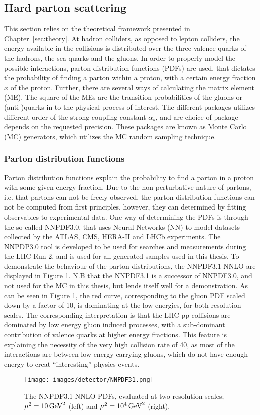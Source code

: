 \subsection*{Hard parton scattering}
\noindent
\justify
This section relies on the theoretical framework presented in Chapter~\ref{sec:theory}. 
At hadron colliders, as opposed to lepton colliders, the energy available in the collisions is distributed over the three valence quarks of the hadrons, the sea quarks and the gluons. 
In order to properly model the possible interactions, parton distribution functions (PDFs) are used, that dictates the probability of finding a parton within a proton, with a certain energy fraction $x$ of the proton. 
Further, there are several ways of calculating the matrix element (ME). The square of the MEs are the transition probabilities of the gluons or (anti-)quarks in to the physical process of interest.
The different packages utilizes different order of the strong coupling constant $\alpha_{s}$, and are choice of package depends on the requested precision.
These packages are known as Monte Carlo (MC) generators, which utilizes the MC random sampling technique.  
\subsubsection*{Parton distribution functions}
\noindent
\justify
Parton distribution functions explain the probability to find a parton in a proton with some given energy fraction. 
Due to the non-perturbative nature of partons, i.e. that partons can not be freely observed, the parton distribution functions can not be computed from first principles, however, they can determined by fitting observables to experimental data. 
One way of determining the PDFs is through the so-called NNPDF3.0, that uses Neural Networks (NN) to model datasets collected by the ATLAS, CMS, HERA-II and LHCb experiments\cite{Ball:2014uwa}. 
The NNPDP3.0 tool is developed to be used for searches and measurements during the LHC Run 2, and is used for all generated samples used in this thesis. 
To demonstrate the behaviour of the parton distributions, the NNPDF3.1 NNLO are displayed in Figure \ref{fig:NNPDF31}. 
N.B that the NNPDF3.1 is a successor of NNPDF3.0, and not used for the MC in this thesis, but lends itself well for a demonstration. 
As can be seen in Figure \ref{fig:NNPDF31}, the red curve, corresponding to the gluon PDF scaled down by a factor of 10, is dominating at the low energies, for both resolution scales. 
The corresponding interpretation is that the LHC pp collisions are dominated by low energy gluon induced processes, with a sub-dominant contribution of valence quarks at higher energy fractions. 
This feature is explaining the necessity of the very high collision rate of 40\MHz, as most of the interactions are between low-energy carrying gluons, which do not have enough energy to creat ``interesting'' physics events.  
\begin{figure}[!htp]
  \centering
   \texttt{[image: images/detector/NNPDF31.png]}
   \caption{The NNPDF3.1 NNLO PDFs, evaluated at two resolution scales; $\mu^{2}=10\,\text{Ge\hspace{-.08em}V}^{2}$ (left) and  $\mu^{2}=10^{4}\,\text{Ge\hspace{-.08em}V}^{2}$ (right)\cite{Ball:2017nwa}.}
   \label{fig:NNPDF31}
\end{figure}
